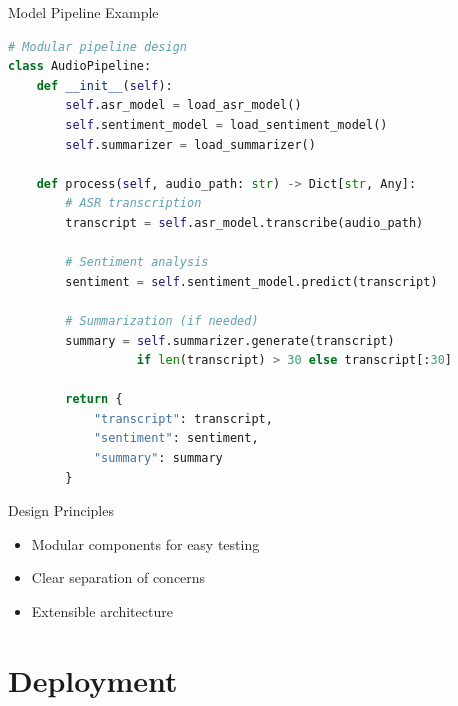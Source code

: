 \documentclass[aspectratio=169,10pt]{beamer}
\begin{document}
\begin{frame}[fragile]{Model Pipeline Example}
\begin{lstlisting}[language=Python, basicstyle=\tiny\ttfamily, keywordstyle=\color{blue}, commentstyle=\color{gray}, stringstyle=\color{red}]
# Modular pipeline design
class AudioPipeline:
    def __init__(self):
        self.asr_model = load_asr_model()
        self.sentiment_model = load_sentiment_model()
        self.summarizer = load_summarizer()
    
    def process(self, audio_path: str) -> Dict[str, Any]:
        # ASR transcription
        transcript = self.asr_model.transcribe(audio_path)
        
        # Sentiment analysis
        sentiment = self.sentiment_model.predict(transcript)
        
        # Summarization (if needed)
        summary = self.summarizer.generate(transcript) 
                  if len(transcript) > 30 else transcript[:30]
        
        return {
            "transcript": transcript,
            "sentiment": sentiment,
            "summary": summary
        }
\end{lstlisting}

\begin{block}{Design Principles}
\begin{itemize}
    \item Modular components for easy testing
    \item Clear separation of concerns
    \item Extensible architecture
\end{itemize}
\end{block}
\end{frame}

\section{Deployment}
\end{document}
